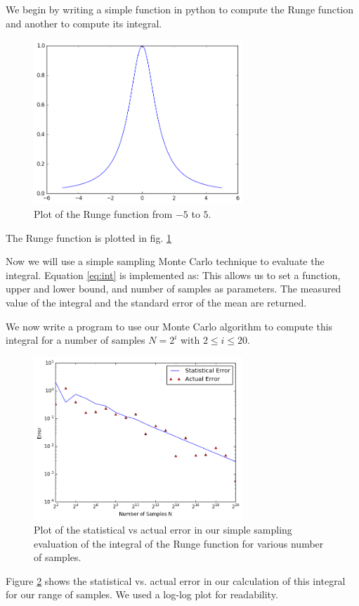 We begin by writing a simple function in python to compute the Runge function and another to compute its integral.
\begin{figure}[ht]
	\centering
	\includegraphics[width=0.7\textwidth]{../fig/rungeplot.png}
	\caption{Plot of the Runge function from $-5$ to $5$.	}
	\label{fig:runge}
\end{figure}
The Runge function is plotted in fig. \ref{fig:runge}

Now we will use a simple sampling Monte Carlo technique to evaluate the integral. Equation \ref{eq:int} is implemented as:
This allows us to set a function, upper and lower bound, and number of samples as parameters. The measured value of the integral and the standard error of the mean are returned. 

We now write a program to use our Monte Carlo algorithm to compute this integral for a number of samples $N = 2^i$ with $2 \leq i \leq 20$. 
\begin{figure}[ht]
	\centering
	\includegraphics[width=0.7\textwidth]{../fig/simple_err.png}
	\caption{Plot of the statistical vs actual error in our simple sampling evaluation of the integral of the Runge function for various number of samples.	}
	\label{fig:simple}
\end{figure}
Figure \ref{fig:simple} shows the statistical vs. actual error in our calculation of this integral for our range of samples. We used a log-log plot for readability.
